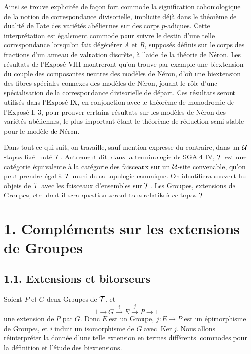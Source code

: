\documentclass[11pt]{article}
\providecommand{\Ker}{\operatorname{Ker}}
\begin{document}
Ainsi se trouve explicitée de façon fort commode la signification cohomologique de la notion de correspondance divisorielle, implicite déjà dans le théorème de dualité de Tate des variétés abéliennes sur des corps \(p\)-adiques.  Cette interprétation est également commode pour suivre le destin d'une telle correspondance lorsqu'on fait dégénérer \(A\) et \(B\), supposés définis sur le corps des fractions d'un anneau de valuation discrète, à l'aide de la théorie de Néron.  Les résultats de l'Exposé VIII montreront qu'on trouve par exemple une biextension du couple des composantes neutres des modèles de Néron, d'où une biextension des fibres spéciales connexes des modèles de Néron, jouant le rôle d'une spécialisation de la correspondance divisorielle de départ.  Ces résultats seront utilisés dans l'Exposé IX, en conjonction avec le théorème de monodromie de l'Exposé I, 3, pour prouver certains résultats sur les modèles de Néron des variétés abéliennes, le plus important étant le théorème de réduction semi-stable pour le modèle de Néron.

Dans tout ce qui suit, on travaille, sauf mention expresse du contraire, dans un \(\mathcal U\)-topos fixé, noté \(\mathcal T\).  Autrement dit, dans la terminologie de SGA 4 IV, \(\mathcal T\) est une catégorie équivalente à la catégorie des faisceaux sur un \(\mathcal U\)-site convenable, qu'on peut prendre égal à \(\mathcal T\) muni de sa topologie canonique.  On identifiera souvent les objets de \(\mathcal T\) avec les faisceaux d'ensembles sur \(\mathcal T\).  Les Groupes, extensions de Groupes, etc. dont il sera question seront tous relatifs à ce topos \(\mathcal T\).

\section*{1. Compléments sur les extensions de Groupes}

\subsection*{1.1. Extensions et bitorseurs}

Soient \(P\) et \(G\) deux Groupes de \(\mathcal T\), et
\begin{equation}\tag{1.1.1}
  1\longrightarrow G\xrightarrow{i}E\xrightarrow{j}P\longrightarrow 1
\end{equation}
une extension de \(P\) par \(G\).  Donc \(E\) est un Groupe, \(j:E\to P\) est un épimorphisme de Groupes, et \(i\) induit un isomorphisme de \(G\) avec \(\Ker j\).  Nous allons réinterpréter la donnée d'une telle extension en termes différents, commodes pour la définition et l'étude des biextensions.
\end{document}
